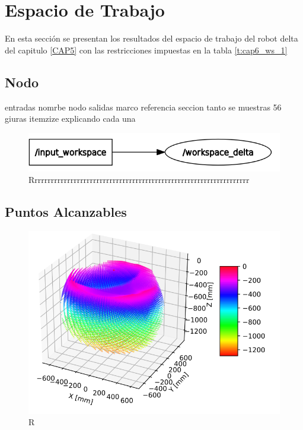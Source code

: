 \newpage


\section{Espacio de Trabajo}
        En esta sección se presentan los resultados del espacio de trabajo del robot delta del capitulo \ref{CAP5} con las restricciones impuestas en la tabla \ref{t:cap6_ws_1}
        
    \subsection{Nodo}
    entradas nomrbe nodo salidas
    marco referencia seccion tanto
    se muestras 56 giuras itemzize explicando cada una 
    
        \begin{figure}[h]
            \centering
            \includegraphics[width=1.0\linewidth]{Main/Chapter7/Images7/nodo_2.png}
            \caption{Rrrrrrrrrrrrrrrrrrrrrrrrrrrrrrrrrrrrrrrrrrrrrrrrrrrrrrrrrrrrrrrrrrr}
            \label{f:cap7_rviz2222}
        \end{figure}  
    
    \subsection{Puntos Alcanzables}
    
        \begin{figure}[h]
            \centering
            \includegraphics[width=1.0\linewidth]{Main/Chapter7/Images7/ws_1.png}
            \caption{R}
            \label{f:cap7_ws1}
        \end{figure}    
        
